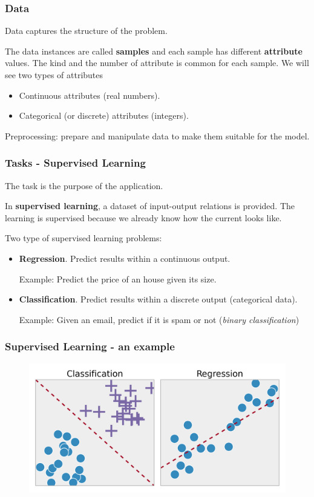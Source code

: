 \documentclass{beamer}
\begin{document}
	\begin{frame}
		\frametitle{Data}
		Data captures the structure of the problem.
		
		\vspace{5mm}
		
		The data instances are called \textbf{samples} and each sample has different \textbf{attribute} values. The kind and the number of attribute is common for each sample. We will see two types of attributes
		
		
		\begin{itemize}
			\item Continuous attributes (real numbers).
			\item Categorical (or discrete) attributes (integers). 
		\end{itemize}
	
		\vspace{5mm}
		
		Preprocessing: prepare and manipulate data to make them suitable for the model.
	\end{frame}
	

	\begin{frame}
		\frametitle{Tasks - Supervised Learning}
		The task is the purpose of the application.
		
		\vspace{5mm}
		
		In \textbf{supervised learning}, a dataset of input-output relations is provided.
		The learning is supervised because we already know how the current looks like.
		
		Two type of supervised learning problems:
		\begin{itemize}
			\item \textbf{Regression}. Predict results within a continuous output.
			
			Example: Predict the price of an house given its size.
			\item \textbf{Classification}.  Predict results within a discrete output (categorical data).
			
			Example: Given an email, predict if it is spam or not (\textsl{binary classification})
		\end{itemize}
	\end{frame}

	\begin{frame}
		\frametitle{Supervised Learning - an example}
		\begin{figure}
			\centering
			\includegraphics[scale=0.22]{images/supervised-learning}
		\end{figure}
	\end{frame}
\end{document}
